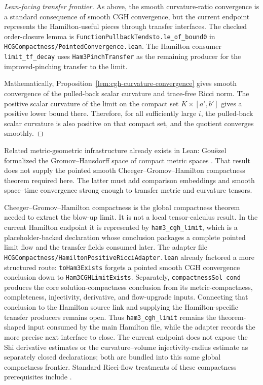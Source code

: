 \documentclass[11pt]{article}
\theoremstyle{plain}
\theoremstyle{definition}
\theoremstyle{remark}
\newcommand{\leanref}[1]{\nolinkurl{#1}}
\newcommand{\leanfile}[1]{\nolinkurl{#1}}
\newcommand{\rffile}[1]{\leanfile{#1}}
\begin{document}
\begin{proof}[Lean-facing transfer frontier]
As above, the smooth curvature-ratio convergence is a standard consequence of
smooth CGH convergence, but the current endpoint represents the Hamilton-useful
pieces through transfer interfaces.  The checked order-closure lemma is
\leanref{FunctionPullbackTendsto.le_of_bound0} in
\rffile{HCGCompactness/PointedConvergence.lean}.  The Hamilton consumer
\leanref{limit_tf_decay} uses \leanref{Ham3PinchTransfer} as the remaining
producer for the improved-pinching transfer to the limit.

Mathematically, Proposition~\ref{lem:cgh-curvature-convergence} gives smooth
convergence of the pulled-back scalar curvature and trace-free Ricci norm.  The
positive scalar curvature of the limit on the compact set $K\times[a',b']$
gives a positive lower bound there.  Therefore, for all sufficiently large
$i$, the pulled-back scalar curvature is also positive on that compact set, and
the quotient converges smoothly.
\end{proof}

Related metric-geometric infrastructure already exists in Lean: Gou\"ezel
formalized the Gromov--Hausdorff space of compact metric spaces
\cite{GouezelGromovHausdorff}.  That result does not supply the pointed smooth
Cheeger--Gromov--Hamilton compactness theorem required here.  The latter must
add comparison embeddings and smooth space--time convergence strong enough to
transfer metric and curvature tensors.

Cheeger--Gromov--Hamilton compactness is the global compactness theorem needed
to extract the blow-up limit.  It is not a local tensor-calculus result.  In the
current Hamilton endpoint it is represented by \leanref{ham3_cgh_limit}, which
is a placeholder-backed declaration whose conclusion packages a complete
pointed limit flow and the transfer fields consumed later.  The adapter file
\rffile{HCGCompactness/HamiltonPositiveRicciAdapter.lean} already
factored a more structured route: \leanref{toHam3Exists} forgets a pointed
smooth CGH convergence conclusion down to \leanref{Ham3CGHLimitExists}.
Separately, \leanref{compactnessSol_cond} produces the core solution-compactness
conclusion from its metric-compactness, completeness, injectivity, derivative,
and flow-upgrade inputs.  Connecting that conclusion to the Hamilton source
link and supplying the Hamilton-specific transfer producers remains open.  Thus
\leanref{ham3_cgh_limit} remains the theorem-shaped input consumed by the main
Hamilton file, while the adapter records the more precise next interface to
close.  The current endpoint does not expose the Shi derivative estimates or
the curvature--volume injectivity-radius estimate as separately closed
declarations; both are bundled into this same global compactness frontier.
Standard Ricci-flow treatments of these compactness prerequisites include
\cite{HamiltonCompactness,Shi1989a,MR2274812,MR2061425}.
\end{document}
